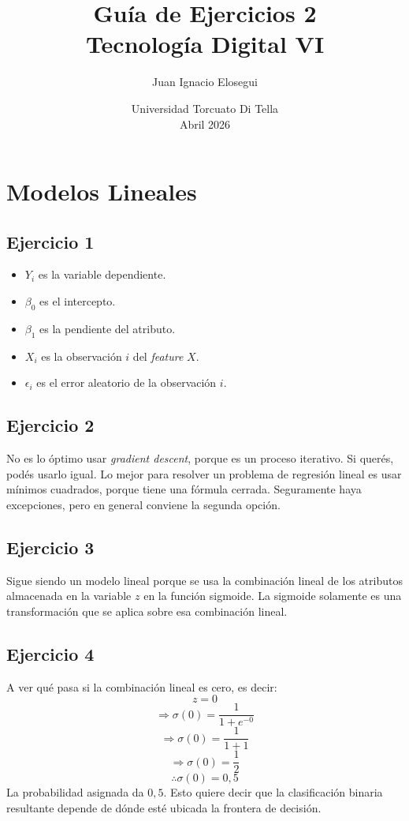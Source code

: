 \documentclass[a4paper,12pt]{article}
\title{\vspace{-2cm}\textbf{Guía de Ejercicios 2}\\[0.2cm]
\large Tecnología Digital VI}
\author{Juan Ignacio Elosegui}
\date{Universidad Torcuato Di Tella \\ Abril 2026}
\begin{document}
    \maketitle
    \section*{Modelos Lineales}
        \subsection*{Ejercicio 1}
            \begin{itemize}
                \item \(Y_{i}\) es la variable dependiente.
                \item \(\beta_{0}\) es el intercepto.
                \item \(\beta_{1}\) es la pendiente del atributo.
                \item \(X_{i}\) es la observación $i$ del \textit{feature} $X$.
                \item \(\epsilon_{i}\) es el error aleatorio de la observación $i$.
            \end{itemize}
        \subsection*{Ejercicio 2}
            \noindent No es lo óptimo usar \textit{gradient descent}, porque es un proceso iterativo. Si querés, podés usarlo igual. Lo mejor para resolver un problema de regresión lineal es usar mínimos cuadrados, porque tiene una fórmula cerrada. Seguramente haya excepciones, pero en general conviene la segunda opción.
        \subsection*{Ejercicio 3}
            \noindent Sigue siendo un modelo lineal porque se usa la combinación lineal de los atributos almacenada en la variable $z$ en la función sigmoide. La sigmoide solamente es una transformación que se aplica sobre esa combinación lineal.
        \subsection*{Ejercicio 4}
            \noindent A ver qué pasa si la combinación lineal es cero, es decir: \[z = 0\]
            \[\Rightarrow \sigma(0) = \frac{1}{1+e^{-0}}\]
            \[\Rightarrow \sigma(0) = \frac{1}{1+1}\]
            \[\Rightarrow \sigma(0) = \frac{1}{2}\]
            \[\therefore \sigma(0) = 0,5\]
            \noindent La probabilidad asignada da $0,5$. Esto quiere decir que la clasificación binaria resultante depende de dónde esté ubicada la frontera de decisión.
\end{document}
